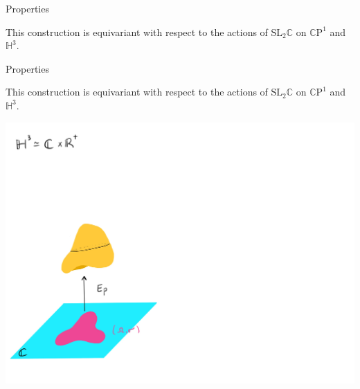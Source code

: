\documentclass[professionalfont]{beamer}
\newcommand{\C}{\mathbb{C}}
\newcommand{\CP}{\mathbb{C}\mathrm{P}}
\renewcommand{\H}{\mathbb{H}}
\begin{document}
\begin{frame}{Properties}

This construction is equivariant with respect to the actions of $\mathrm{SL}_2\C$ on $\CP^1$ and $\H^3$. 



\end{frame}




\begin{frame}{Properties}

This construction is equivariant with respect to the actions of $\mathrm{SL}_2\C$ on $\CP^1$ and $\H^3$. 

\centering\includegraphics[scale=0.1]{Equivariant-2.jpg}


\end{frame}
\end{document}
